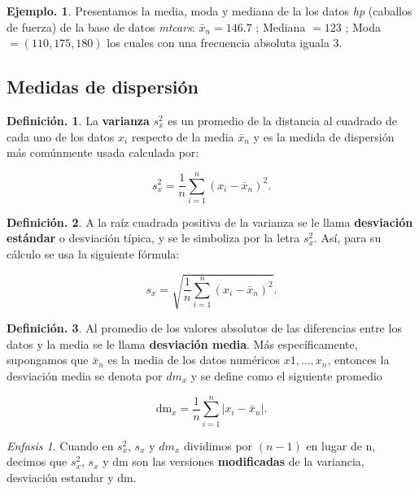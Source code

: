 \documentclass[]{book}
\theoremstyle{definition}
\newtheorem{definition}{Definición.}[chapter]
\theoremstyle{definition}
\newtheorem{example}{Ejemplo.}[chapter]
\theoremstyle{definition}
\theoremstyle{remark}
\newtheorem*{remark}{Enfasis}
\begin{document}
\begin{example}
\protect\hypertarget{exm:unnamed-chunk-86}{}{\label{exm:unnamed-chunk-86} }Presentamos la media, moda y mediana de la los datos
\emph{hp} (caballos de fuerza) de la base de datos
\emph{mtcars}: \(\bar{x}_n= 146.7\) ; Mediana \(= 123\) ; Moda
\(=(110, 175, 180)\) los cuales con una
frecuencia absoluta iguala \(3\).
\end{example}

\hypertarget{medidas-de-dispersiuxf3n}{%
\subsection{Medidas de dispersión}\label{medidas-de-dispersiuxf3n}}

\begin{definition}
\protect\hypertarget{def:unnamed-chunk-87}{}{\label{def:unnamed-chunk-87} }
La \textbf{varianza} \(s_x^2\) es un promedio de la distancia
al cuadrado de cada uno de los
datos \(x_i\) respecto de la media \(\bar{x}_n\) y es la
medida de dispersión más comúnmente
usada calculada por:

\[s_x^2 = \frac{1}{n}\sum_{i=1}^{n} (x_i - \bar{x}_n)^2.
  \]
\end{definition}

\begin{definition}
\protect\hypertarget{def:unnamed-chunk-88}{}{\label{def:unnamed-chunk-88} }
A la raíz cuadrada positiva de la varianza se le llama
\textbf{desviación estándar} o
desviación típica, y se le simboliza por la letra
\(s_x^2\). Así, para su cálculo se usa la
siguiente fórmula:

\[s_x = \sqrt{ \frac{1}{n}\sum_{i=1}^{n} (x_i - 
                  \bar{x}_n)^2}.  \]
\end{definition}

\begin{definition}
\protect\hypertarget{def:unnamed-chunk-89}{}{\label{def:unnamed-chunk-89} }
Al promedio de los valores absolutos de las diferencias
entre los datos y la
media se le llama \textbf{desviación media}. Más
específicamente, supongamos que \(\bar{x}_n\)
es la media de los datos numéricos \(x1, \ldots , x_n\),
entonces la desviación media
se denota por \(dm_x\) y se define como el siguiente
promedio

\[\mbox{dm}_x = \frac{1}{n}\sum_{i=1}^{n} |x_i -
     \bar{x}_n|.  \]
\end{definition}

\begin{remark}
\iffalse{} {Enfasis.} \fi{}
Cuando en \(s_x^2\), \(s_x\) y \(dm_x\) dividimos por \((n-1)\)
en lugar de n, decimos que \(s_x^2\),
\(s_x\) y dm son las versiones \textbf{modificadas} de la
variancia, desviación estandar y dm.
\end{remark}
\end{document}
